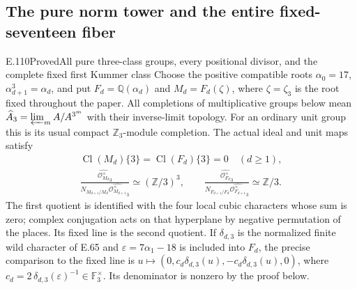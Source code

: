 \subsection{The pure norm tower and the entire fixed-seventeen fiber}

\begin{statement}{E.110}{Proved}{All pure three-class groups, every positional divisor, and the complete fixed first Kummer class}
Choose the positive compatible roots
$\alpha_0=17$, $\alpha_{d+1}^3=\alpha_d$, and put
$F_d=\mathbb Q(\alpha_d)$ and $M_d=F_d(\zeta)$, where
$\zeta=\zeta_3$ is the root fixed throughout the paper.
All completions of multiplicative groups below mean
$\widehat{A}_3=\varprojlim_m A/A^{3^m}$ with their inverse-limit
topology. For an ordinary unit group this is its usual compact
$\mathbb Z_3$-module completion. The actual ideal and unit maps satisfy
\[
 \begin{gathered}
 \operatorname{Cl}(M_d)\{3\}=\operatorname{Cl}(F_d)\{3\}=0
       \quad(d\geq1),\\
 \frac{\widehat{\mathcal O_{M_d}^{\times}}_3}
      {N_{M_{d+1}/M_d}\widehat{\mathcal O_{M_{d+1}}^{\times}}_3}
       \simeq(\mathbb Z/3)^3,\qquad
 \frac{\widehat{\mathcal O_{F_d}^{\times}}_3}
      {N_{F_{d+1}/F_d}\widehat{\mathcal O_{F_{d+1}}^{\times}}_3}
       \simeq\mathbb Z/3 .
 \end{gathered}
 \tag{E110.1}
\]
The first quotient is identified with the four local cubic characters
whose sum is zero; complex conjugation acts on that hyperplane by
negative permutation of the places. Its fixed line is the second
quotient. If $\delta_{d,3}$ is the normalized finite wild character
of E.65 and $\varepsilon=7\alpha_1-18$ is included into $F_d$,
the precise comparison to the fixed line is
$u\mapsto(0,c_d\delta_{d,3}(u),-c_d\delta_{d,3}(u),0)$, where
$c_d=2\,\delta_{d,3}(\varepsilon)^{-1}\in\mathbb F_3^\times$.
Its denominator is nonzero by the proof below.


\end{statement}
